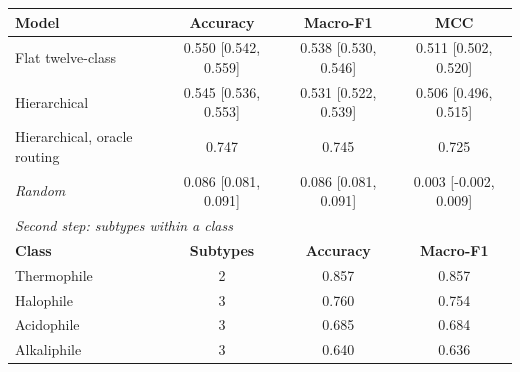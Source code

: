 \begin{tabular}{lccc}
\hline
\textbf{Model} & \textbf{Accuracy} & \textbf{Macro-F1} & \textbf{MCC} \\
\hline
Flat twelve-class & 0.550 {\scriptsize[0.542, 0.559]} & 0.538 {\scriptsize[0.530, 0.546]} & 0.511 {\scriptsize[0.502, 0.520]} \\
Hierarchical & 0.545 {\scriptsize[0.536, 0.553]} & 0.531 {\scriptsize[0.522, 0.539]} & 0.506 {\scriptsize[0.496, 0.515]} \\
Hierarchical, oracle routing & 0.747 & 0.745 & 0.725 \\
\textit{Random} & 0.086 {\scriptsize[0.081, 0.091]} & 0.086 {\scriptsize[0.081, 0.091]} & 0.003 {\scriptsize[-0.002, 0.009]} \\
\hline
\multicolumn{4}{l}{\textit{Second step: subtypes within a class}} \\
\textbf{Class} & \textbf{Subtypes} & \textbf{Accuracy} & \textbf{Macro-F1} \\
\hline
Thermophile & 2 & 0.857 & 0.857 \\
Halophile & 3 & 0.760 & 0.754 \\
Acidophile & 3 & 0.685 & 0.684 \\
Alkaliphile & 3 & 0.640 & 0.636 \\
\hline
\end{tabular}
